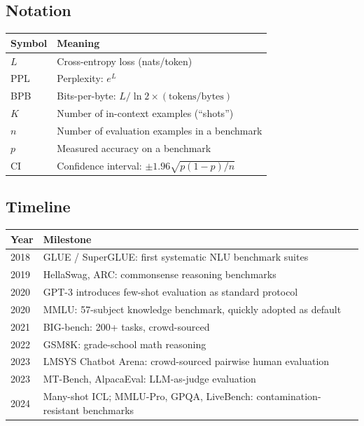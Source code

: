 \subsection*{Notation}

\begin{center}
\begin{tabular}{ll}
\toprule
Symbol & Meaning \\
\midrule
$L$ & Cross-entropy loss (nats/token) \\
PPL & Perplexity: $e^L$ \\
BPB & Bits-per-byte: $L / \ln 2 \times (\text{tokens}/\text{bytes})$ \\
$K$ & Number of in-context examples (``shots'') \\
$n$ & Number of evaluation examples in a benchmark \\
$p$ & Measured accuracy on a benchmark \\
CI & Confidence interval: $\pm 1.96\sqrt{p(1-p)/n}$ \\
\bottomrule
\end{tabular}
\end{center}


\subsection*{Timeline}

\begin{center}
\begin{tabularx}{\textwidth}{@{}lX@{}}
\toprule
\textbf{Year} & \textbf{Milestone} \\
\midrule
2018 & GLUE / SuperGLUE: first systematic NLU benchmark suites \\
2019 & HellaSwag, ARC: commonsense reasoning benchmarks \\
2020 & GPT-3 introduces few-shot evaluation as standard protocol \\
2020 & MMLU: 57-subject knowledge benchmark, quickly adopted as default \\
2021 & BIG-bench: 200+ tasks, crowd-sourced \\
2022 & GSM8K: grade-school math reasoning \\
2023 & LMSYS Chatbot Arena: crowd-sourced pairwise human evaluation \\
2023 & MT-Bench, AlpacaEval: LLM-as-judge evaluation \\
2024 & Many-shot ICL; MMLU-Pro, GPQA, LiveBench: contamination-resistant benchmarks \\
\bottomrule
\end{tabularx}
\end{center}



